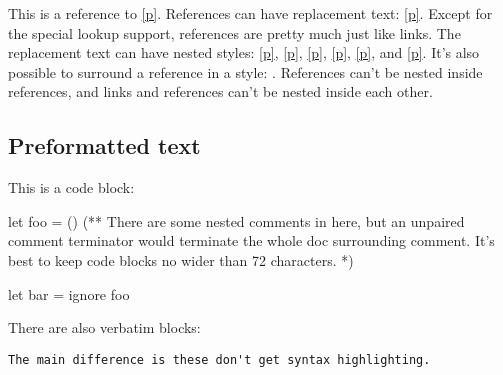 This is a reference to \hyperref[cpage-test+u+package+++ml-module-Markup-val-foo]{[p\pageref*{cpage-test+u+package+++ml-module-Markup-val-foo}]}. References can have replacement text: \hyperref[cpage-test+u+package+++ml-module-Markup-val-foo]{[p\pageref*{cpage-test+u+package+++ml-module-Markup-val-foo}]}. Except for the special lookup support, references are pretty much just like links. The replacement text can have nested styles: \hyperref[cpage-test+u+package+++ml-module-Markup-val-foo]{[p\pageref*{cpage-test+u+package+++ml-module-Markup-val-foo}]}, \hyperref[cpage-test+u+package+++ml-module-Markup-val-foo]{[p\pageref*{cpage-test+u+package+++ml-module-Markup-val-foo}]}, \hyperref[cpage-test+u+package+++ml-module-Markup-val-foo]{[p\pageref*{cpage-test+u+package+++ml-module-Markup-val-foo}]}, \hyperref[cpage-test+u+package+++ml-module-Markup-val-foo]{[p\pageref*{cpage-test+u+package+++ml-module-Markup-val-foo}]}, \hyperref[cpage-test+u+package+++ml-module-Markup-val-foo]{[p\pageref*{cpage-test+u+package+++ml-module-Markup-val-foo}]}, and \hyperref[cpage-test+u+package+++ml-module-Markup-val-foo]{[p\pageref*{cpage-test+u+package+++ml-module-Markup-val-foo}]}. It's also possible to surround a reference in a style: . References can't be nested inside references, and links and references can't be nested inside each other.

\subsection{Preformatted text\label{preformatted-text}}%
This is a code block:\medbreak
\begin{ocamlcodeblock}
let foo = ()
(** There are some nested comments in here, but an unpaired comment
    terminator would terminate the whole doc surrounding comment. It's
    best to keep code blocks no wider than 72 characters. *)

let bar =
  ignore foo
\end{ocamlcodeblock}\medbreak
There are also verbatim blocks:

\begin{verbatim}The main difference is these don't get syntax highlighting.\end{verbatim}%
